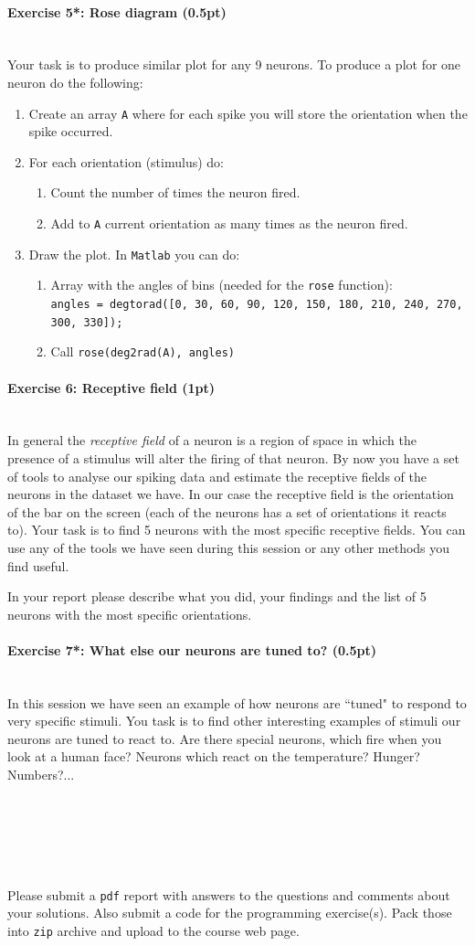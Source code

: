 \documentclass[a4paper,11pt]{article}
\newenvironment{exercise}[3]{\paragraph{Exercise #1: #2 (#3pt)}\ \\}{
\medskip}
\begin{document}
\begin{exercise}{5*}{Rose diagram}{0.5}
Your task is to produce similar plot for any 9 neurons. To produce a plot for one neuron do the following:
\begin{enumerate}
	\item Create an array \texttt{A} where for each spike you will store the orientation when the spike occurred.
	\item For each orientation (stimulus) do:
	\begin{enumerate}
		\item Count the number of times the neuron fired.
		\item Add to \texttt{A} current orientation as many times as the neuron fired.
	\end{enumerate}
	\item Draw the plot. In \texttt{Matlab} you can do:
	\begin{enumerate}
		\item Array with the angles of bins (needed for the \texttt{rose} function):\\ \texttt{angles = degtorad([0, 30, 60, 90, 120, 150, 180, 210, 240, 270, 300, 330]);}
		\item Call \texttt{rose(deg2rad(A), angles)}
	\end{enumerate}
\end{enumerate}
\end{exercise}


\begin{exercise}{6}{Receptive field}{1}
In general the \emph{receptive field} of a neuron is a region of space in which the presence of a stimulus will alter the firing of that neuron. By now you have a set of tools to analyse our spiking data and estimate the receptive fields of the neurons in the dataset we have. In our case the receptive field is the orientation of the bar on the screen (each of the neurons has a set of orientations it reacts to). Your task is to find 5 neurons with the most specific receptive fields. You can use any of the tools we have seen during this session or any other methods you find useful.

In your report please describe what you did, your findings and the list of 5 neurons with the most specific orientations.
\end{exercise}


\begin{exercise}{7*}{What else our neurons are tuned to?}{0.5}
In this session we have seen an example of how neurons are ``tuned" to respond to very specific stimuli. You task is to find  other interesting examples of stimuli our neurons are tuned to react to. Are there special neurons, which fire when you look at a human face? Neurons which react on the temperature? Hunger? Numbers?...
\end{exercise}



\ \\
\ \\
\ \\
\ \\
\ \\
Please submit a \texttt{pdf} report with answers to the questions and comments about your solutions. Also submit a code for the programming exercise(s). Pack those into \texttt{zip} archive and upload to the course web page.
\end{document}
